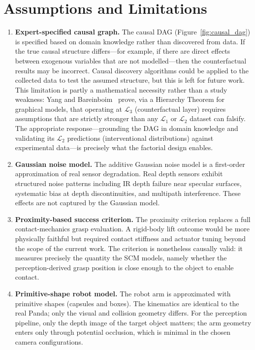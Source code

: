 \documentclass[11pt,a4paper]{report}
\begin{document}
\section{Assumptions and Limitations}
\label{sec:limitations}

\begin{enumerate}
  \item \textbf{Expert-specified causal graph.} The causal DAG (Figure~\ref{fig:causal_dag}) is specified based on domain knowledge rather than discovered from data. If the true causal structure differs---for example, if there are direct effects between exogenous variables that are not modelled---then the counterfactual results may be incorrect. Causal discovery algorithms could be applied to the collected data to test the assumed structure, but this is left for future work. This limitation is partly a mathematical necessity rather than a study weakness: Yang and Bareinboim~\cite{yang2025hierarchy} prove, via a Hierarchy Theorem for graphical models, that operating at $\mathcal{L}_3$ (counterfactual layer) requires assumptions that are strictly stronger than any $\mathcal{L}_1$ or $\mathcal{L}_2$ dataset can falsify. The appropriate response---grounding the DAG in domain knowledge and validating its $\mathcal{L}_2$ predictions (interventional distributions) against experimental data---is precisely what the factorial design enables.

  \item \textbf{Gaussian noise model.} The additive Gaussian noise model is a first-order approximation of real sensor degradation. Real depth sensors exhibit structured noise patterns including IR depth failure near specular surfaces, systematic bias at depth discontinuities, and multipath interference. These effects are not captured by the Gaussian model.

  \item \textbf{Proximity-based success criterion.} The proximity criterion replaces a full contact-mechanics grasp evaluation. A rigid-body lift outcome would be more physically faithful but required contact stiffness and actuator tuning beyond the scope of the current work. The criterion is nonetheless causally valid: it measures precisely the quantity the SCM models, namely whether the perception-derived grasp position is close enough to the object to enable contact.

  \item \textbf{Primitive-shape robot model.} The robot arm is approximated with primitive shapes (capsules and boxes). The kinematics are identical to the real Panda; only the visual and collision geometry differs. For the perception pipeline, only the depth image of the target object matters; the arm geometry enters only through potential occlusion, which is minimal in the chosen camera configurations.


\end{enumerate}
\end{document}
